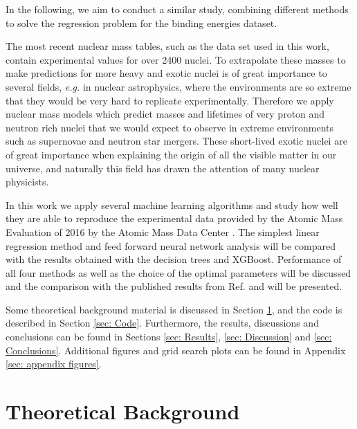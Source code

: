 \documentclass[numberedappendix, twocolappendix]{emulateapj}
\begin{document}
In the following, we aim to conduct a similar study, combining different methods to solve the regression problem for the binding energies dataset.

The most recent nuclear mass tables, such as the data set used in this work, contain experimental values for over 2400 nuclei. To extrapolate these masses to make predictions for more heavy and exotic nuclei is of great importance to several fields, \textit{e.g.} in nuclear astrophysics, where the environments are so extreme that they would be very hard to replicate experimentally. Therefore we apply nuclear mass models which predict masses and lifetimes of very proton and neutron rich nuclei that we would expect to observe in extreme environments such as supernovae and neutron star mergers. These short-lived exotic nuclei are of great importance when explaining the origin of all the visible matter in our universe, and naturally this field has drawn the attention of many nuclear physicists. 

 In this work we apply several machine learning algorithms and study how well they are able to reproduce the experimental data provided by the Atomic Mass Evaluation of 2016 by the Atomic Mass Data Center \cite{ame16}. The simplest linear regression method \cite{proj1_1, proj1_2} and feed forward neural network analysis \cite{proj2} will be compared with the results obtained with the decision trees and XGBoost. Performance of all four methods as well as the choice of the optimal parameters will be discussed and the comparison with the published results from Ref.\cite{utama2017} and \cite{trees in nuclear} will be presented.

Some theoretical background material is discussed in Section \ref{sec: Theoretical background}, and the code is described in Section \ref{sec: Code}. Furthermore, the results, discussions and conclusions can be found in Sections \ref{sec: Results}, \ref{sec: Discussion} and \ref{sec: Conclusions}. Additional figures and grid search plots can be found in Appendix \ref{sec: appendix figures}.


\vspace{1cm}
\section{Theoretical Background}\label{sec: Theoretical background}
\end{document}
